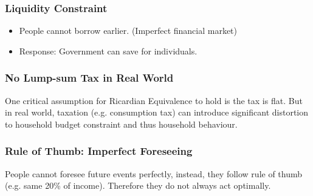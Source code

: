 \documentclass[]{article}
\begin{document}
			\subsubsection{Liquidity Constraint}
				\begin{itemize}
					\item People cannot borrow earlier. (Imperfect financial market)
					\item Response: Government can save for individuals.
				\end{itemize}
			
			\subsubsection{No Lump-sum Tax in Real World}
				\par One critical assumption for Ricardian Equivalence to hold is the tax is flat. But in real world, taxation (e.g. consumption tax) can introduce significant distortion to household budget constraint and thus household behaviour.
				
			\subsubsection{Rule of Thumb: Imperfect Foreseeing}
				\par People cannot foresee future events perfectly, instead, they follow rule of thumb (e.g. same 20\% of income). Therefore they do not always act optimally.
\end{document}

